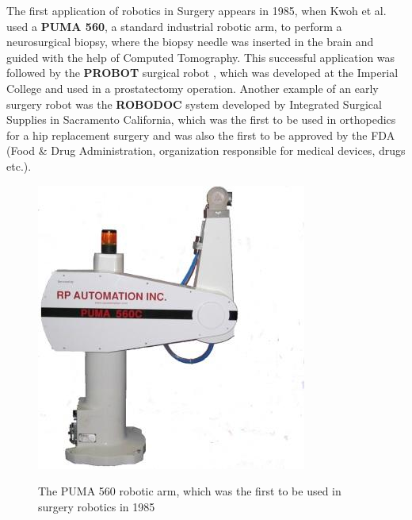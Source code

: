 The first application of robotics in Surgery appears in 1985, when Kwoh et al. \cite{Shao1985ANC} used a \textbf{PUMA 560}, a standard industrial robotic arm, to perform a neurosurgical biopsy, 
where the biopsy needle was inserted in the brain and guided with the help of Computed Tomography. This successful application was followed by the \textbf{PROBOT} surgical robot \cite{Probot1992}, 
which was developed at the Imperial College and used in a prostatectomy operation. Another example of an early surgery robot was the \textbf{ROBODOC} system \cite{Robodoc} developed by Integrated Surgical Supplies 
in Sacramento California, which was the first to be used in orthopedics for a hip replacement surgery and was also the first to be approved by the FDA (Food \& Drug Administration, organization responsible 
for medical devices, drugs etc.).

\begin{center}
\begin{figure}[!htb]
\centering
\includegraphics{images/Puma560.jpg}\\
\caption{The PUMA 560 robotic arm, which was the first to be used in surgery robotics in 1985}
\end{figure}
\end{center}

